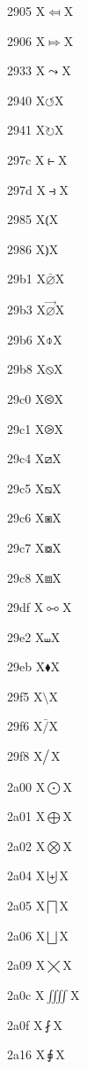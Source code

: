\documentclass[11pt]{article}
\begin{document}
2905 X{\ensuremath{\Mapsfrom}}X

2906 X{\ensuremath{\Mapsto}}X

2933 X{\ensuremath{\leadsto}}X

2940 X{\ensuremath{\circlearrowleft}}X

2941 X{\ensuremath{\circlearrowright}}X

297c X{\ensuremath{\strictfi}}X

297d X{\ensuremath{\strictif}}X

2985 X{\ensuremath{\Lparen}}X

2986 X{\ensuremath{\Rparen}}X

29b1 X{\ensuremath{\bar{\varnothing}}}X

29b3 X{\ensuremath{\vec{\varnothing}}}X

29b6 X{\ensuremath{\obar}}X

29b8 X{\ensuremath{\obslash}}X

29c0 X{\ensuremath{\olessthan}}X

29c1 X{\ensuremath{\ogreaterthan}}X

29c4 X{\ensuremath{\boxslash}}X

29c5 X{\ensuremath{\boxbslash}}X

29c6 X{\ensuremath{\boxast}}X

29c7 X{\ensuremath{\boxcircle}}X

29c8 X{\ensuremath{\boxbox}}X

29df X{\ensuremath{\multimapboth}}X

29e2 X{\ensuremath{\shuffle}}X

29eb X{\ensuremath{\blacklozenge}}X

29f5 X{\ensuremath{\setminus}}X

29f6 X{\ensuremath{\bar{/}}}X

29f8 X{\ensuremath{\big{/}}}X

2a00 X{\ensuremath{\bigodot}}X

2a01 X{\ensuremath{\bigoplus}}X

2a02 X{\ensuremath{\bigotimes}}X

2a04 X{\ensuremath{\biguplus}}X

2a05 X{\ensuremath{\bigsqcap}}X

2a06 X{\ensuremath{\bigsqcup}}X

2a09 X{\ensuremath{\varprod}}X

2a0c X{\ensuremath{\iiiint}}X

2a0f X{\ensuremath{\fint}}X

2a16 X{\ensuremath{\sqint}}X
\end{document}
